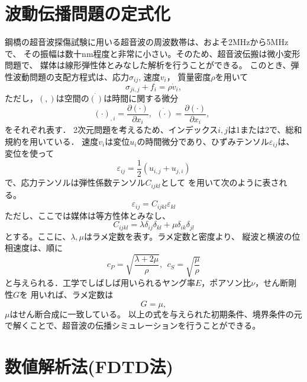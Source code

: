 \section{波動伝播問題の定式化}
鋼橋の超音波探傷試験に用いる超音波の周波数帯は、およそ2MHzから5MHzで、
その振幅は数十nm程度と非常に小さい。そのため、超音波伝搬は微小変形問題で、
媒体は線形弾性体とみなした解析を行うことができる。
このとき、弾性波動問題の支配方程式は、応力$\sigma_{ij}$, 速度$v_i$，
質量密度$\rho$を用いて
\begin{equation}
	\sigma_{ji,j}+f_i=\rho \dot{v}_i,
	\label{eqn:}
\end{equation}
ただし，$(,)$は空間の$\dot{()}$は時間に関する微分
\begin{equation}
	(\cdot)_{,i}=\frac{\partial (\cdot)}{\partial x_i}, \ \ 
	\dot{(\cdot)}=\frac{\partial (\cdot)}{\partial x_i}, \ \ 
	\label{eqn:}
\end{equation}
をそれぞれ表す．
2次元問題を考えるため、インデックス$i,j$は1または2で、総和規約を用いている．
速度$v_i$は変位$u_i$の時間微分であり、ひずみテンソル$\varepsilon_{ij}$は、
変位を使って
\begin{equation}
	\varepsilon_{ij}=\frac{1}{2}(u_{i,j}+u_{j,i})
	\label{eqn:}
\end{equation}
で、応力テンソルは弾性係数テンソル$C_{ijkl}$として
を用いて次のように表される。
\begin{equation}
	\varepsilon_{ij}=C_{ijkl}\varepsilon_{kl}
	\label{eqn:}
\end{equation}
ただし、ここでは媒体は等方性体とみなし、
\begin{equation}
	C_{ijkl}=\lambda \delta_{ij}\delta_{kl} +\mu \delta_{ik}\delta_{jl}
	\label{eqn:}
\end{equation}
とする。ここに、$\lambda, \mu$はラメ定数を表す。ラメ定数と密度より、
縦波と横波の位相速度は、順に
\begin{equation}
	c_{P}=\sqrt{\frac{\lambda + 2\mu}{\rho}}
	, \ \ 
	c_{S}=\sqrt{\frac{\mu}{\rho}}
	\label{eqn:}
\end{equation}
と与えられる．工学でしばしば用いられるヤング率$E$，ポアソン比$\nu$，せん断剛性$G$を
用いれば、ラメ定数は
\begin{equation}
	G=\mu, 
	\label{eqn:}
\end{equation}
$\mu$はせん断合成に一致している。
以上の式を与えられた初期条件、境界条件の元で解くことで、超音波の伝播シミュレーションを行うことができる。
\section{数値解析法(FDTD法)}
